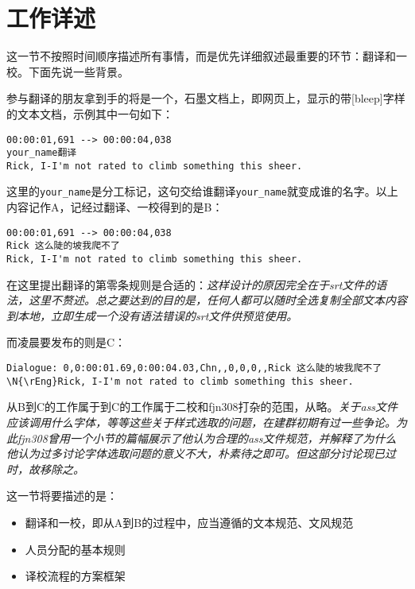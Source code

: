 \documentclass{ctexart}
\begin{document}
\section{工作详述}

这一节不按照时间顺序描述所有事情，而是优先详细叙述最重要的环节：翻译和一校。下面先说一些背景。

参与翻译的朋友拿到手的将是一个，石墨文档上，即网页上，显示的带[bleep]字样的文本文档，示例其中一句如下：

{\small
\begin{verbatim}
00:00:01,691 --> 00:00:04,038
your_name翻译
Rick, I-I'm not rated to climb something this sheer.
\end{verbatim}
}

这里的\texttt{your\_name}是分工标记，这句交给谁翻译\texttt{your\_name}就变成谁的名字。以上内容记作A，记经过翻译、一校得到的是B：

{\small
\begin{verbatim}
00:00:01,691 --> 00:00:04,038
Rick 这么陡的坡我爬不了
Rick, I-I'm not rated to climb something this sheer.
\end{verbatim}
}

在这里提出翻译的第零条规则是合适的：\emph{\small 这样设计的原因完全在于srt文件的语法，这里不赘述。总之要达到的目的是，任何人都可以随时全选复制全部文本内容到本地，立即生成一个没有语法错误的srt文件供预览使用。}

而凌晨要发布的则是C：

{\small
\begin{verbatim}
Dialogue: 0,0:00:01.69,0:00:04.03,Chn,,0,0,0,,Rick 这么陡的坡我爬不了
\N{\rEng}Rick, I-I'm not rated to climb something this sheer.
\end{verbatim}
}

从B到C的工作属于到C的工作属于二校和fjn308打杂的范围，从略。\emph{\small 关于ass文件应该调用什么字体，等等这些关于样式选取的问题，在建群初期有过一些争论。为此fjn308曾用一个小节的篇幅展示了他认为合理的ass文件规范，并解释了为什么他认为过多讨论字体选取问题的意义不大，朴素待之即可。但这部分讨论现已过时，故移除之。}

这一节将要描述的是：

\begin{itemize}
    \item 翻译和一校，即从A到B的过程中，应当遵循的文本规范、文风规范
    \item 人员分配的基本规则
    \item 译校流程的方案框架
\end{itemize}
\end{document}
